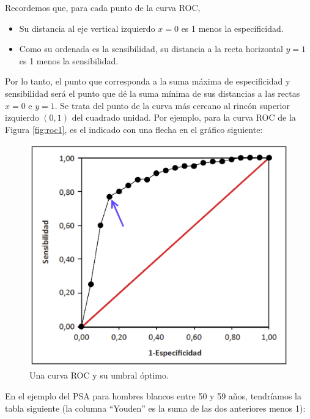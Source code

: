\documentclass[
]{book}
\theoremstyle{definition}
\theoremstyle{definition}
\theoremstyle{definition}
\theoremstyle{definition}
\theoremstyle{remark}
\begin{document}
Recordemos que, para cada punto de la curva ROC,

\begin{itemize}
\item
  Su distancia al eje vertical izquierdo \(x=0\) es 1 menos la especificidad.
\item
  Como su ordenada es la sensibilidad, su distancia a la recta horizontal \(y=1\) es 1 menos la sensibilidad.
\end{itemize}

Por lo tanto, el punto que corresponda a la suma máxima de especificidad y sensibilidad será el punto que dé la suma mínima de sus distancias a las rectas \(x=0\) e \(y=1\). Se trata del punto de la curva más cercano al rincón superior izquierdo \((0,1)\) del cuadrado unidad. Por ejemplo, para la curva ROC de la Figura \ref{fig:roc1}, es el indicado con una flecha en el gráfico siguiente:

\begin{figure}

{\centering \includegraphics[width=0.5\linewidth]{INREMDN_files/figure-html/roc2} 

}

\caption{Una curva ROC y su umbral óptimo.}\label{fig:roc2}
\end{figure}

En el ejemplo del PSA para hombres blancos entre 50 y 59 años, tendríamos la tabla siguiente (la columna ``Youden'' es la suma de las dos anteriores menos 1):
\end{document}
